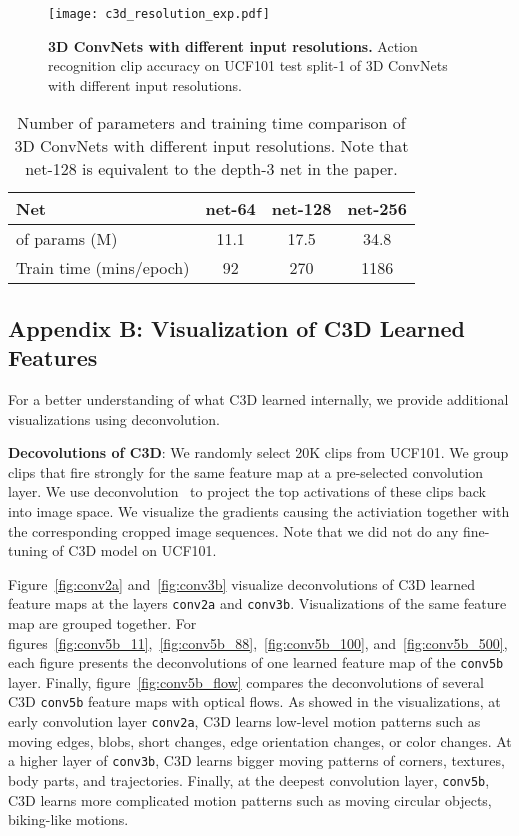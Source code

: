 \documentclass[10pt,twocolumn,letterpaper]{article}
\begin{document}
\begin{figure}
\begin{center}
   \texttt{[image: c3d\_resolution\_exp.pdf]}
\end{center}
   \caption{{\bf 3D ConvNets with different input resolutions.} Action recognition clip accuracy on UCF101 test split-1 of 3D ConvNets with different input resolutions.}
\label{fig:c3d_resolution_exp}
\end{figure}


\begin{table}[h]
\begin{center}
\begin{tabular}{|l|c|c|c|}
\hline
Net & net-64 & net-128 & net-256 \\
\hline
 of params (M) & 11.1 & 17.5 & 34.8 \\
Train time (mins/epoch) & 92 & 270 & 1186 \\
\hline
\end{tabular}
\end{center}
\caption{Number of parameters and training time comparison of 3D ConvNets with different input resolutions. Note that net-128 is equivalent to the depth-3 net in the paper.}
\label{tab:params}
\end{table} 
\subsection*{Appendix B: Visualization of C3D Learned Features}

For a better understanding of what C3D learned internally, we provide additional visualizations using deconvolution.

{\bf Decovolutions of C3D}: We randomly select 20K clips from UCF101. We group clips that fire strongly for the same feature map at a pre-selected convolution layer. We use deconvolution~\cite{ZeilerF14} to project the top activations of these clips back into image space. We visualize the gradients causing the activiation together with the corresponding cropped image sequences. Note that we did not do any fine-tuning of C3D model on UCF101.

Figure~\ref{fig:conv2a} and~\ref{fig:conv3b} visualize deconvolutions of C3D learned feature maps at the layers \texttt{conv2a} and \texttt{conv3b}. Visualizations of the same feature map are grouped together. For figures~\ref{fig:conv5b_11},~\ref{fig:conv5b_88},~\ref{fig:conv5b_100}, and~\ref{fig:conv5b_500}, each figure presents the deconvolutions of one learned feature map of the \texttt{conv5b} layer. Finally, figure~\ref{fig:conv5b_flow} compares the deconvolutions of several C3D \texttt{conv5b} feature maps with optical flows. As showed in the visualizations, at early convolution layer \texttt{conv2a}, C3D learns low-level motion patterns such as moving edges, blobs, short changes, edge orientation changes, or color changes. At a higher layer of \texttt{conv3b}, C3D learns bigger moving patterns of corners, textures, body parts, and trajectories. Finally, at the deepest convolution layer, \texttt{conv5b}, C3D learns more complicated motion patterns such as moving circular objects, biking-like motions.
\end{document}
